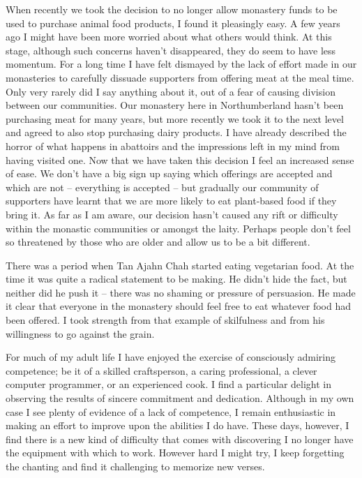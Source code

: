 When recently we took the decision to no longer allow monastery funds to be
used to purchase animal food products, I found it pleasingly easy. A few
years ago I might have been more worried about what others would think.
At this stage, although such concerns haven't disappeared, they do seem
to have less momentum. For a long time I have felt dismayed by the lack
of effort made in our monasteries to carefully dissuade supporters from
offering meat at the meal time. Only very rarely did I say anything
about it, out of a fear of causing division between our communities. Our
monastery here in Northumberland hasn't been purchasing meat for many
years, but more recently we took it to the next level and agreed to also
stop purchasing dairy products. I have already described the horror of
what happens in abattoirs and the impressions left in my mind from
having visited one. Now that we have taken this decision I feel an
increased sense of ease. We don't have a big sign up saying which
offerings are accepted and which are not -- everything is accepted --
but gradually our community of supporters have learnt that we are more
likely to eat plant-based food if they bring it. As far as I am aware,
our decision hasn't caused any rift or difficulty within the monastic
communities or amongst the laity. Perhaps people don't feel so
threatened by those who are older and allow us to be a bit different.

There was a period when Tan Ajahn Chah started eating vegetarian food.
At the time it was quite a radical statement to be making. He didn't
hide the fact, but neither did he push it -- there was no shaming or
pressure of persuasion. He made it clear that everyone in the monastery
should feel free to eat whatever food had been offered. I took strength
from that example of skilfulness and from his willingness to go against
the grain.

For much of my adult life I have enjoyed the exercise of consciously
admiring competence; be it of a skilled craftsperson, a caring
professional, a clever computer programmer, or an experienced cook. I
find a particular delight in observing the results of sincere commitment
and dedication. Although in my own case I see plenty of evidence of a
lack of competence, I remain enthusiastic in making an effort to improve
upon the abilities I do have. These days, however, I find there is a new
kind of difficulty that comes with discovering I no longer have the
equipment with which to work. However hard I might try, I keep
forgetting the chanting and find it challenging to memorize new verses.

